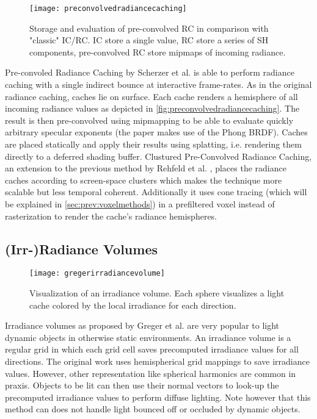 \documentclass[thesis.tex]{subfiles}
\begin{document}
\begin{figure}[h]
	\centering
	\texttt{[image: preconvolvedradiancecaching]}
	\caption{\cite{bib:preconvoledradiancecaching} Storage and evaluation of pre-convolved RC in comparison with "classic" IC/RC.
	IC store a single value,
	RC store a series of SH components,
	pre-convolved RC store mipmaps of incoming radiance.} \label{fig:preconvolvedradiancecaching}
\end{figure}
Pre-convoled Radiance Caching by Scherzer et al. \cite{bib:preconvoledradiancecaching} is able to perform radiance caching with a single indirect bounce at interactive frame-rates.
As in the original radiance caching, caches lie on surface.
Each cache renders a hemisphere of all incoming radiance values as depicted in \autoref{fig:preconvolvedradiancecaching}.
The result is then pre-convolved using mipmapping to be able to evaluate quickly arbitrary specular exponents (the paper makes use of the Phong BRDF).
Caches are placed statically and apply their results using splatting, i.e. rendering them directly to a deferred shading buffer.
Clustured Pre-Convolved Radiance Caching, an extension to the previous method by Rehfeld et al. \cite{bib:clusteredpreconvoledradiancecaching}, places the radiance caches according to screen-space clusters which makes the technique more scalable but less temporal coherent.
Additionally it uses cone tracing (which will be explained in \autoref{sec:prev:voxelmethods}) in a prefiltered voxel instead of rasterization to render the cache's radiance hemispheres.

\subsection{(Irr-)Radiance Volumes}

\begin{figure}[h]
	\centering
	\texttt{[image: gregerirradiancevolume]}
	\caption{\cite{bib:irradiancevolume} Visualization of an irradiance volume. Each sphere visualizes a light cache colored by the local irradiance for each direction. } \label{fig:irradiancevolume}
\end{figure}
Irradiance volumes as proposed by Greger et al. \cite{bib:irradiancevolume} are very popular to light dynamic objects in otherwise static environments.
An irradiance volume is a regular grid in which each grid cell saves precomputed irradiance values for all directions.
The original work uses hemispherical grid mappings to save irradiance values.
However, other representation like spherical harmonics are common in praxis.
Objects to be lit can then use their normal vectors to look-up the precomputed irradiance values to perform diffuse lighting.
Note however that this method can does not handle light bounced off or occluded by dynamic objects.
\end{document}
